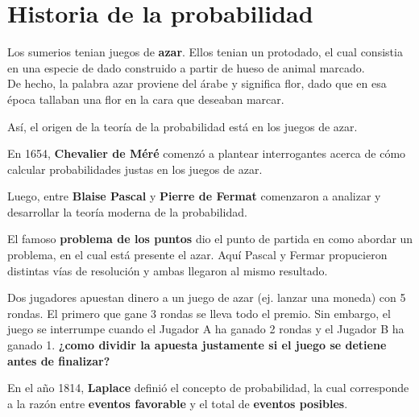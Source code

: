 \documentclass[
  letterpaper,
  DIV=11,
  numbers=noendperiod]{scrreprt}
\begin{document}
\section{Historia de la probabilidad}\label{historia-de-la-probabilidad}

Los sumerios tenian juegos de \textbf{azar}. Ellos tenian un protodado,
el cual consistia en una especie de dado construido a partir de hueso de
animal marcado.\\
De hecho, la palabra azar proviene del árabe y significa flor, dado que
en esa época tallaban una flor en la cara que deseaban marcar.

Así, el origen de la teoría de la probabilidad está en los juegos de
azar.

En 1654, \textbf{Chevalier de Méré} comenzó a plantear interrogantes
acerca de cómo calcular probabilidades justas en los juegos de azar.

Luego, entre \textbf{Blaise Pascal} y \textbf{Pierre de Fermat}
comenzaron a analizar y desarrollar la teoría moderna de la
probabilidad.

El famoso \textbf{problema de los puntos} dio el punto de partida en
como abordar un problema, en el cual está presente el azar. Aquí Pascal
y Fermar propucieron distintas vías de resolución y ambas llegaron al
mismo resultado.

\begin{tcolorbox}[enhanced jigsaw, arc=.35mm, bottomrule=.15mm, bottomtitle=1mm, breakable, colback=white, colbacktitle=quarto-callout-tip-color!10!white, colframe=quarto-callout-tip-color-frame, coltitle=black, left=2mm, leftrule=.75mm, opacityback=0, opacitybacktitle=0.6, rightrule=.15mm, title=\textcolor{quarto-callout-tip-color}{\faLightbulb}\hspace{0.5em}{Problema de los puntos}, titlerule=0mm, toprule=.15mm, toptitle=1mm]

Dos jugadores apuestan dinero a un juego de azar (ej. lanzar una moneda)
con 5 rondas. El primero que gane 3 rondas se lleva todo el premio. Sin
embargo, el juego se interrumpe cuando el Jugador A ha ganado 2 rondas y
el Jugador B ha ganado 1. \textbf{¿como dividir la apuesta justamente si
el juego se detiene antes de finalizar?}

\end{tcolorbox}

En el año 1814, \textbf{Laplace} definió el concepto de probabilidad, la
cual corresponde a la razón entre \textbf{eventos favorable} y el total
de \textbf{eventos posibles}.
\end{document}
